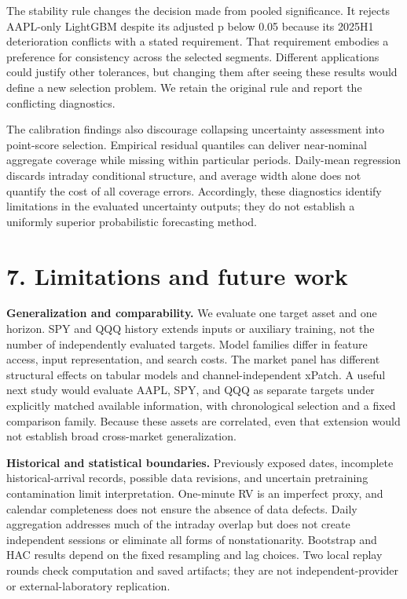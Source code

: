 The stability rule changes the decision made from pooled significance.
It rejects AAPL-only LightGBM despite its adjusted p below 0.05 because
its 2025H1 deterioration conflicts with a stated requirement. That
requirement embodies a preference for consistency across the selected
segments. Different applications could justify other tolerances, but
changing them after seeing these results would define a new selection
problem. We retain the original rule and report the conflicting
diagnostics.

The calibration findings also discourage collapsing uncertainty
assessment into point-score selection. Empirical residual quantiles can
deliver near-nominal aggregate coverage while missing within particular
periods. Daily-mean regression discards intraday conditional structure,
and average width alone does not quantify the cost of all coverage
errors. Accordingly, these diagnostics identify limitations in the
evaluated uncertainty outputs; they do not establish a uniformly
superior probabilistic forecasting method.

\section{7. Limitations and future
work}\label{limitations-and-future-work}

\textbf{Generalization and comparability.} We evaluate one target asset
and one horizon. SPY and QQQ history extends inputs or auxiliary
training, not the number of independently evaluated targets. Model
families differ in feature access, input representation, and search
costs. The market panel has different structural effects on tabular
models and channel-independent xPatch. A useful next study would
evaluate AAPL, SPY, and QQQ as separate targets under explicitly matched
available information, with chronological selection and a fixed
comparison family. Because these assets are correlated, even that
extension would not establish broad cross-market generalization.

\textbf{Historical and statistical boundaries.} Previously exposed
dates, incomplete historical-arrival records, possible data revisions,
and uncertain pretraining contamination limit interpretation. One-minute
RV is an imperfect proxy, and calendar completeness does not ensure the
absence of data defects. Daily aggregation addresses much of the
intraday overlap but does not create independent sessions or eliminate
all forms of nonstationarity. Bootstrap and HAC results depend on the
fixed resampling and lag choices. Two local replay rounds check
computation and saved artifacts; they are not independent-provider or
external-laboratory replication.

